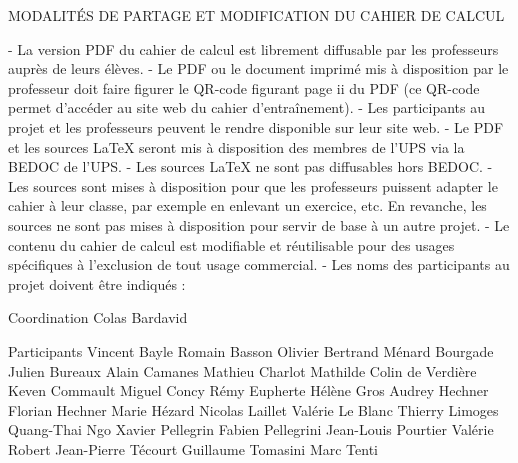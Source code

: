 MODALITÉS DE PARTAGE ET MODIFICATION DU CAHIER DE CALCUL

- La version PDF du cahier de calcul est librement diffusable par les professeurs auprès de leurs élèves.
- Le PDF ou le document imprimé mis à disposition par le professeur doit faire figurer le QR-code figurant page ii du PDF (ce QR-code permet d'accéder au site web du cahier d'entraînement).
- Les participants au projet et les professeurs peuvent le rendre disponible sur leur site web.
- Le PDF et les sources LaTeX seront mis à disposition des membres de l'UPS via la BEDOC de l'UPS.
- Les sources LaTeX ne sont pas diffusables hors BEDOC.
- Les sources sont mises à disposition pour que les professeurs puissent adapter le cahier à leur classe, par exemple en enlevant un exercice, etc. En revanche, les sources ne sont pas mises à disposition pour servir de base à un autre projet.
- Le contenu du cahier de calcul est modifiable et réutilisable pour des usages spécifiques à l'exclusion de tout usage commercial.
- Les noms des participants au projet doivent être indiqués :

Coordination
Colas Bardavid

Participants
Vincent Bayle
Romain Basson
Olivier Bertrand
Ménard Bourgade
Julien Bureaux
Alain Camanes
Mathieu Charlot
Mathilde Colin de Verdière
Keven Commault
Miguel Concy
Rémy Eupherte
Hélène Gros
Audrey Hechner
Florian Hechner
Marie Hézard
Nicolas Laillet
Valérie Le Blanc
Thierry Limoges
Quang-Thai Ngo
Xavier Pellegrin
Fabien Pellegrini
Jean-Louis Pourtier
Valérie Robert
Jean-Pierre Técourt
Guillaume Tomasini
Marc Tenti